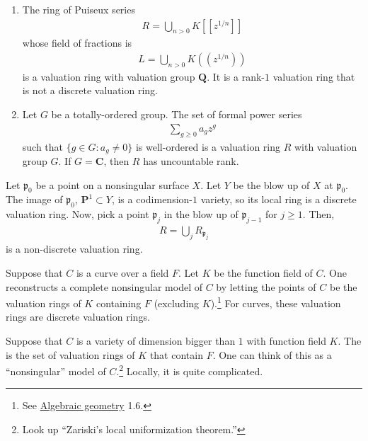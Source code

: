 \documentclass [11 pt, oneside] {article}
\begin{document}
\begin{example}\label{}\text{}
\begin{enumerate}
	\item The ring of Puiseux series
		\begin{align*}
			R = \bigcup_{n>0} K[\![z^{1/n}]\!]
		\end{align*}
		whose field of fractions is
		\begin{align*}
			L = \bigcup_{n>0} K(\!(z^{1/n})\!)
		\end{align*}
		is a valuation ring with valuation group $\mathbf{Q}$. It is a rank-$1$ valuation ring that is not a discrete valuation ring. 
	\item Let $G$ be a totally-ordered group. The set of formal power series
		\begin{align*}
			\sum_{g\ge 0}^{} a_gz^g
		\end{align*}
		such that $\{g\in G: a_g\ne 0\}$ is well-ordered is a valuation ring $R$ with valuation group $G$. If $G=\mathbf{C}$, then $R$ has uncountable rank.
\end{enumerate}
\end{example}

Let $\mathfrak{p}_0$ be a point on a nonsingular surface $X$. Let $Y$ be the blow up of $X$ at $\mathfrak{p}_0$. The image of $\mathfrak{p}_0$, $\mathbf{P}^1\subset Y$, is a codimension-$1$ variety, so its local ring is a discrete valuation ring. Now, pick a point $\mathfrak{p}_j$ in the blow up of $\mathfrak{p}_{j-1}$ for $j\ge 1$. Then,
\begin{align*}
	R = \bigcup_j R_{\mathfrak{p}_j}
\end{align*}
is a non-discrete valuation ring.

Suppose that $C$ is a curve over a field $F$. Let $K$ be the function field of $C$. One reconstructs a complete nonsingular model of $C$ by letting the points of $C$ be the valuation rings of $K$ containing $F$ (excluding $K$).\footnote{See \ul{Algebraic geometry} 1.6.} For curves, these valuation rings are discrete valuation rings.

Suppose that $C$ is a variety of dimension bigger than $1$ with function field $K$. The  is the set of valuation rings of $K$ that contain $F$. One can think of this as a ``nonsingular'' model of $C$.\footnote{Look up ``Zariski's local uniformization theorem.''} Locally, it is quite complicated.
\end{document}
